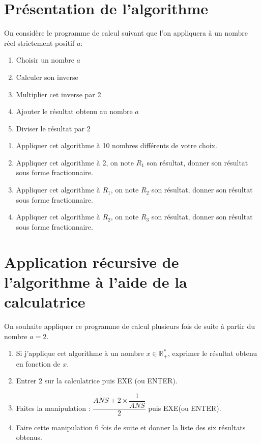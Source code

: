 \documentclass[french]{article}
\begin{document}
\section*{Présentation de l'algorithme}
On considère le programme de calcul suivant que l'on appliquera à un nombre réel strictement positif $a$:

\begin{enumerate}
\item[] Choisir un nombre $a$
\item[] Calculer son inverse
\item[] Multiplier cet inverse par 2
\item[] Ajouter le résultat obtenu au nombre $a$
\item[] Diviser le résultat par 2 \\
\end{enumerate}

\begin{enumerate}
\item Appliquer cet algorithme à 10 nombres différents de votre choix.
\item Appliquer cet algorithme à 2, on note $R_1$ son résultat, donner son résultat sous forme fractionnaire.
\item Appliquer cet algorithme à $R_1$, on note $R_2$ son résultat, donner son résultat sous forme fractionnaire. 
\item Appliquer cet algorithme à $R_2$, on note $R_3$ son résultat, donner son résultat sous forme fractionnaire. 
\end{enumerate}

\section*{Application récursive de l'algorithme à l'aide de la calculatrice}

On souhaite appliquer ce programme de calcul plusieurs fois de suite à partir du nombre $a=2$.

\begin{enumerate}
\item Si j'applique cet algorithme à un nombre $x \in \mathbb{R}^*_+$, exprimer le résultat obtenu en fonction de $x$.
\item Entrer 2 sur la calculatrice puis EXE (ou ENTER).
\item Faites la manipulation : $\dfrac{ANS + 2 \times \dfrac{1}{ANS}}{2}$ puis EXE(ou ENTER).
\item Faire cette manipulation 6 fois de suite et donner la liste des six résultats obtenus.
\end{enumerate}
\end{document}
